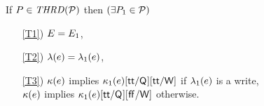 
\noindent
If $\aPS \in \sTHREAD{\aPSS}$ then
$(\exists P_1\in\mathcal{P})$
\begin{enumerate}
\item[\ref{T1})]
  $E=E_1$,
\item[\ref{T2})]
  $\lambda(e) = \lambda_1(e)$,
\item[\ref{T3})]
  $\kappa(e)$ implies
  $\kappa_1(e)[\mathsf{tt}/\mathsf{Q}_{}][\mathsf{tt}/\mathsf{W}]$ if $\lambda_1(e)$ is a write,
  \\
  $\kappa(e)$ implies
  $\kappa_1(e)[\mathsf{tt}/\mathsf{Q}_{}][\mkern.6mu\mathsf{ff}\mkern.6mu/\mathsf{W}]$ otherwise.
\end{enumerate}  
